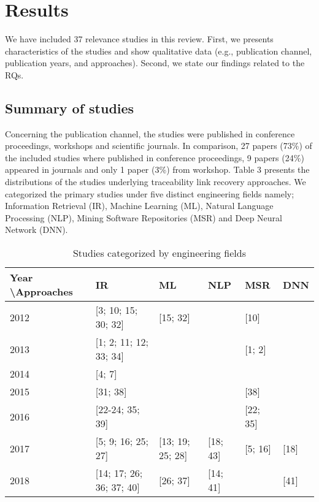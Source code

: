 \documentclass[conference]{IEEEtran}
\begin{document}
\section{Results}
We have included 37 relevance studies in this review. First, we presents characteristics of the studies and show qualitative data (e.g., publication channel, publication years, and approaches). Second, we state our findings related to the RQs. 
\subsection{Summary of studies}
Concerning the publication channel, the studies were published in conference proceedings, workshops and scientific journals. In comparison, 27 papers (73\%) of the included studies where published in conference proceedings, 9 papers (24\%) appeared in journals and only 1 paper (3\%) from workshop.
Table 3 presents the distributions of the studies underlying traceability link recovery approaches. We categorized the primary studies under five distinct engineering fields namely; Information Retrieval (IR), Machine Learning (ML), Natural Language Processing (NLP), Mining Software Repositories (MSR) and Deep Neural Network  (DNN).  
\begin{table}[h!]
\begin{tabular} {|p{1.5cm}|p{1cm}|p{1cm}|p{1cm}| p{1cm}|p{1cm}|}
\hline
\textbf{Year \textbackslash Approaches} & \textbf{IR} & \textbf{ML} & \textbf{NLP} & \textbf{MSR} & \textbf{DNN}\\
\hline
2012 & [3; 10; 15; 30; 32] &[15; 32] & & [10] & \\
\hline
2013 & [1; 2; 11; 12; 33; 34] & & & [1; 2] & \\
\hline
2014 & [4; 7] & & & & \\
\hline
2015 & [31; 38] & & & [38] & \\
\hline
2016 & [22-24; 35; 39] & & & [22; 35] & \\
\hline
2017 & [5; 9; 16; 25; 27] &[13; 19; 25; 28] &[18; 43] & [5; 16]&[18] \\
\hline
2018 & [14; 17; 26; 36; 37; 40] &[26; 37]& [14; 41] & & [41]\\
\hline
\end{tabular}
\caption{Studies categorized by engineering fields}
\label{table:StudyTrends}
\end{table}
\end{document}
